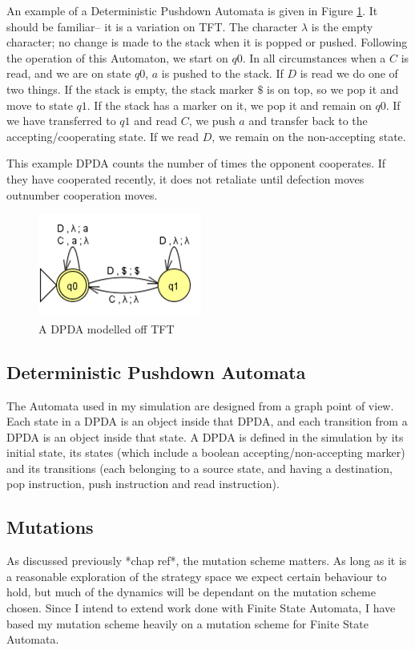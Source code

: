 \documentclass[a4paper,11pt,bcshonoursthesis,singlespace,twoside,thesisdraft,pdflatex]{cssethesis}
\begin{document}
An example of a Deterministic Pushdown Automata is given in Figure \ref{fig:dpda}. 
It should be familiar-- it is a variation on TFT. 
The character $\lambda$ is the empty character; no change is made to the stack when it is popped or pushed. Following the operation of this Automaton, we start on $q0$. In all circumstances when a $C$ is read, and we are on state $q0$, $a$ is pushed to the stack. 
If $D$ is read we do one of two things. If the stack is empty, the stack marker $\$$ is on top, so we pop it and move to state $q1$. 
If the stack has a marker on it, we pop it and remain on $q0$. 
If we have transferred to $q1$ and read $C$, we push $a$ and transfer back to the accepting/cooperating state. 
If we read $D$, we remain on the non-accepting state.

This example DPDA counts the number of times the opponent cooperates. 
If they have cooperated recently, it does not retaliate until defection moves outnumber cooperation moves. 

\begin{figure}[h]
\centering
\includegraphics[scale=0.6]{pdatft}
\caption{A DPDA modelled off TFT}
\label{fig:dpda}
\end{figure}

\subsection{Deterministic Pushdown Automata}
The Automata used in my simulation are designed from a graph point of view. 
Each state in a DPDA is an object inside that DPDA, and each transition from a DPDA is an object inside that state. 
A DPDA is defined in the simulation by its initial state, its states (which include a boolean accepting/non-accepting marker) and its transitions (each belonging to a source state, and having a destination, pop instruction, push instruction and read instruction). 
\subsection{Mutations}
As discussed previously *chap ref*, the mutation scheme matters. As long as it is a reasonable exploration of the strategy space we expect certain behaviour to hold, but much of the dynamics will be dependant on the mutation scheme chosen. Since I intend to extend work done with Finite State Automata, I have based my mutation scheme heavily on a mutation scheme for Finite State Automata.
\end{document}
